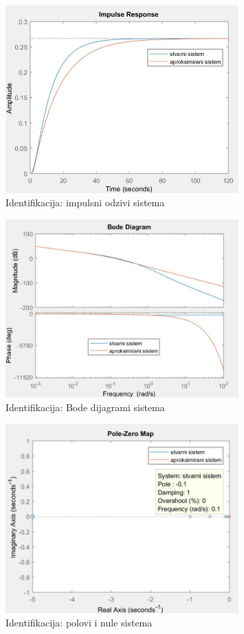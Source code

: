 \begin{figure} [H]
  \centering
  \includegraphics[width=0.8\textwidth]{z2_3}
  \caption{Identifikacija: impulsni odzivi sistema}
  \label{fig:z2_3}
\end{figure}

\begin{figure} [H]
  \centering
  \includegraphics[width=0.8\textwidth]{z2_4}
  \caption{Identifikacija: Bode dijagrami sistema}
  \label{fig:z2_4}
\end{figure}
 
 \begin{figure} [H]
  \centering
  \includegraphics[width=0.8\textwidth]{z2_5}
  \caption{Identifikacija: polovi i nule sistema}
  \label{fig:z2_5}
\end{figure}

